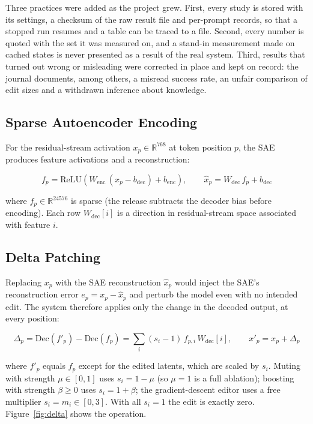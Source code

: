 \documentclass[12pt,a4paper]{report}
\begin{document}
Three practices were added as the project grew. First, every study is stored with its settings, a checksum of the raw result file and per-prompt records, so that a stopped run resumes and a table can be traced to a file. Second, every number is quoted with the set it was measured on, and a stand-in measurement made on cached states is never presented as a result of the real system. Third, results that turned out wrong or misleading were corrected in place and kept on record: the journal documents, among others, a misread success rate, an unfair comparison of edit sizes and a withdrawn inference about knowledge.

\subsection{Sparse Autoencoder Encoding}

For the residual-stream activation $x_p \in \mathbb{R}^{768}$ at token position $p$, the SAE produces feature activations and a reconstruction:

\begin{equation}
f_p = \mathrm{ReLU}\left(W_{\text{enc}}\,(x_p - b_{\text{dec}}) + b_{\text{enc}}\right), \qquad \hat{x}_p = W_{\text{dec}}\, f_p + b_{\text{dec}}
\label{eq:3-1}
\end{equation}

where $f_p \in \mathbb{R}^{24576}$ is sparse (the release subtracts the decoder bias before encoding). Each row $W_{\text{dec}}[i]$ is a direction in residual-stream space associated with feature $i$.

\subsection{Delta Patching}

Replacing $x_p$ with the SAE reconstruction $\hat{x}_p$ would inject the SAE's reconstruction error $e_p = x_p - \hat{x}_p$ and perturb the model even with no intended edit. The system therefore applies only the change in the decoded output, at every position:

\begin{equation}
\Delta_p = \mathrm{Dec}(f'_p) - \mathrm{Dec}(f_p) = \sum_i (s_i - 1)\, f_{p,i}\, W_{\text{dec}}[i], \qquad x'_p = x_p + \Delta_p
\label{eq:3-2}
\end{equation}

where $f'_p$ equals $f_p$ except for the edited latents, which are scaled by $s_i$. Muting with strength $\mu \in [0,1]$ uses $s_i = 1-\mu$ (so $\mu = 1$ is a full ablation); boosting with strength $\beta \ge 0$ uses $s_i = 1+\beta$; the gradient-descent editor uses a free multiplier $s_i = m_i \in [0,3]$. With all $s_i = 1$ the edit is exactly zero. Figure~\ref{fig:delta} shows the operation.
\end{document}
